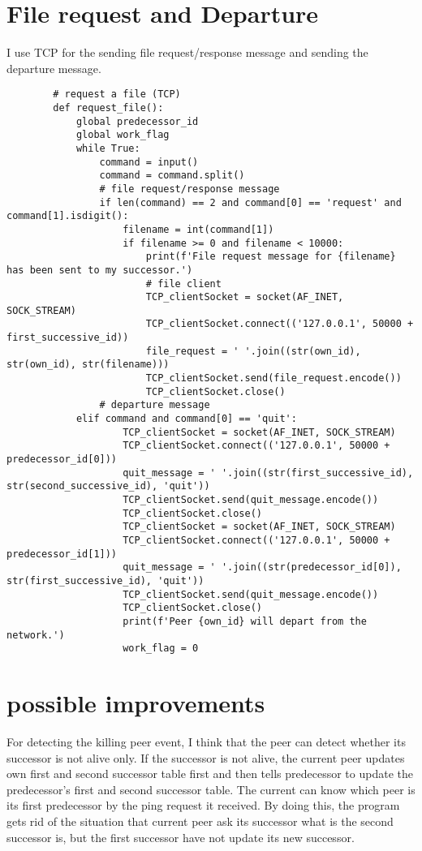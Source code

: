 \documentclass{article}
\begin{document}
	\section{File request and Departure}
		I use TCP for the sending file request/response message and sending the departure message.
		\begin{lstlisting}
		# request a file (TCP)
		def request_file():
			global predecessor_id
			global work_flag
			while True:
				command = input()
				command = command.split()
				# file request/response message
				if len(command) == 2 and command[0] == 'request' and command[1].isdigit():
					filename = int(command[1])
					if filename >= 0 and filename < 10000:
						print(f'File request message for {filename} has been sent to my successor.')
						# file client
						TCP_clientSocket = socket(AF_INET, SOCK_STREAM)
						TCP_clientSocket.connect(('127.0.0.1', 50000 + first_successive_id))
						file_request = ' '.join((str(own_id), str(own_id), str(filename)))
						TCP_clientSocket.send(file_request.encode())
						TCP_clientSocket.close()
				# departure message
      		elif command and command[0] == 'quit':
					TCP_clientSocket = socket(AF_INET, SOCK_STREAM)
					TCP_clientSocket.connect(('127.0.0.1', 50000 + predecessor_id[0]))
					quit_message = ' '.join((str(first_successive_id), str(second_successive_id), 'quit'))
					TCP_clientSocket.send(quit_message.encode())                
					TCP_clientSocket.close()
					TCP_clientSocket = socket(AF_INET, SOCK_STREAM)
					TCP_clientSocket.connect(('127.0.0.1', 50000 + predecessor_id[1]))
					quit_message = ' '.join((str(predecessor_id[0]), str(first_successive_id), 'quit'))
					TCP_clientSocket.send(quit_message.encode())                
					TCP_clientSocket.close()
					print(f'Peer {own_id} will depart from the network.')
					work_flag = 0
		\end{lstlisting}
	\section{possible improvements}
		For detecting the killing peer event, I think that the peer can detect whether its successor is not alive only. If the successor is not alive, the current peer updates own first and second successor table first and then tells predecessor to update the predecessor's first and second successor table. The current can know which peer is its first predecessor by the ping request it received. By doing this, the program gets rid of the situation that current peer ask its successor what is the second successor is, but the first successor have not update its new successor.
		
\end{document}
